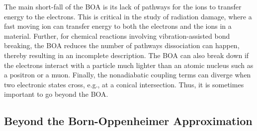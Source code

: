 The main short-fall of the BOA is its lack of pathways for the ions to transfer energy to the electrons. This is critical in the study of radiation damage, where a fast moving ion can transfer energy to both the electrons and the ions in a material.
Further, for chemical reactions involving vibration-assisted bond breaking, the BOA reduces the number of pathways dissociation can happen, thereby resulting in an incomplete description.
The BOA can also break down if the electrons interact with a particle much lighter than an atomic nucleus such as a positron or a muon.
Finally, the nonadiabatic coupling terms can diverge when two electronic states cross, e.g., at a conical intersection.
Thus, it is sometimes important to go beyond the BOA.

\subsection{Beyond the Born-Oppenheimer Approximation}

